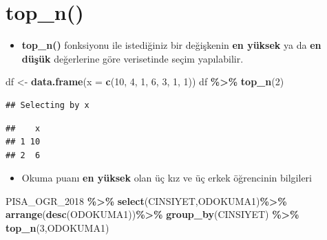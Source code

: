 \documentclass[
  oneside]{book}
\newenvironment{Shaded}{\begin{snugshade}}{\end{snugshade}}
\newcommand{\AttributeTok}[1]{\textcolor[rgb]{0.13,0.29,0.53}{#1}}
\newcommand{\DecValTok}[1]{\textcolor[rgb]{0.00,0.00,0.81}{#1}}
\newcommand{\FunctionTok}[1]{\textcolor[rgb]{0.13,0.29,0.53}{\textbf{#1}}}
\newcommand{\NormalTok}[1]{#1}
\newcommand{\OtherTok}[1]{\textcolor[rgb]{0.56,0.35,0.01}{#1}}
\newcommand{\SpecialCharTok}[1]{\textcolor[rgb]{0.81,0.36,0.00}{\textbf{#1}}}
\providecommand{\tightlist}{%
  \setlength{\itemsep}{0pt}\setlength{\parskip}{0pt}}
\begin{document}
\hypertarget{top_n}{%
\section{top\_n()}\label{top_n}}

\begin{itemize}
\tightlist
\item
  \textbf{top\_n()} fonksiyonu ile istediğiniz bir değişkenin \textbf{en yüksek} ya da \textbf{en düşük} değerlerine göre verisetinde seçim yapılabilir.
\end{itemize}

\begin{Shaded}
\begin{Highlighting}[]
\NormalTok{df }\OtherTok{\textless{}{-}} \FunctionTok{data.frame}\NormalTok{(}\AttributeTok{x =} \FunctionTok{c}\NormalTok{(}\DecValTok{10}\NormalTok{, }\DecValTok{4}\NormalTok{, }\DecValTok{1}\NormalTok{, }\DecValTok{6}\NormalTok{, }\DecValTok{3}\NormalTok{, }\DecValTok{1}\NormalTok{, }\DecValTok{1}\NormalTok{))}
\NormalTok{df }\SpecialCharTok{\%\textgreater{}\%} \FunctionTok{top\_n}\NormalTok{(}\DecValTok{2}\NormalTok{)}
\end{Highlighting}
\end{Shaded}

\begin{verbatim}
## Selecting by x
\end{verbatim}

\begin{verbatim}
##    x
## 1 10
## 2  6
\end{verbatim}

\begin{itemize}
\tightlist
\item
  Okuma puanı \textbf{en yüksek} olan üç kız ve üç erkek öğrencinin bilgileri
\end{itemize}

\begin{Shaded}
\begin{Highlighting}[]
\NormalTok{PISA\_OGR\_2018 }\SpecialCharTok{\%\textgreater{}\%}
  \FunctionTok{select}\NormalTok{(CINSIYET,ODOKUMA1)}\SpecialCharTok{\%\textgreater{}\%} 
  \FunctionTok{arrange}\NormalTok{(}\FunctionTok{desc}\NormalTok{(ODOKUMA1))}\SpecialCharTok{\%\textgreater{}\%} 
  \FunctionTok{group\_by}\NormalTok{(CINSIYET) }\SpecialCharTok{\%\textgreater{}\%} 
  \FunctionTok{top\_n}\NormalTok{(}\DecValTok{3}\NormalTok{,ODOKUMA1)}
\end{Highlighting}
\end{Shaded}
\end{document}
